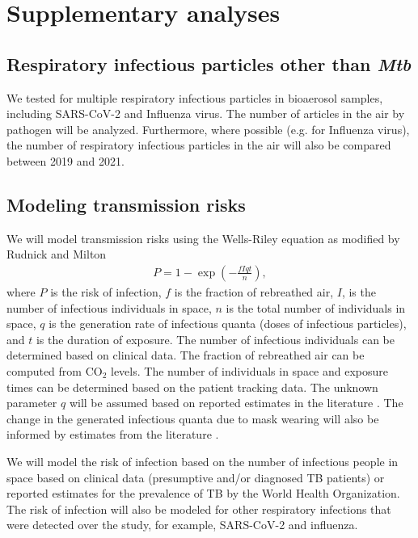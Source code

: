 \documentclass{article}
\begin{document}
\section{Supplementary analyses}

\subsection{Respiratory infectious particles other than \emph{Mtb}}

We tested for multiple respiratory infectious particles in bioaerosol samples, including SARS-CoV-2 and Influenza virus. The number of articles in the air by pathogen will be analyzed. Furthermore, where possible (e.g. for Influenza virus), the number of respiratory infectious particles in the air will also be compared between 2019 and 2021. 

\subsection{Modeling transmission risks}

We will model transmission risks using the Wells-Riley equation\cite{Riley1962ARRD} as modified by Rudnick and Milton\cite{Rudnick2003IndoorAir} 
\begin{align*}
    P = 1 - \exp\left(-\frac{fIqt}{n}\right),
\end{align*}
where $P$ is the risk of infection, $f$ is the fraction of rebreathed air, $I$, is the number of infectious individuals in space, $n$ is the total number of individuals in space, $q$ is the generation rate of infectious quanta (doses of infectious particles), and $t$ is the duration of exposure. The number of infectious individuals can be determined based on clinical data. The fraction of rebreathed air can be computed from CO$_2$ levels. The number of individuals in space and exposure times can be determined based on the patient tracking data. The unknown parameter $q$ will be assumed based on reported estimates in the literature \cite{Mikszewski2021GF,Banholzer2024PGPH,Andrews2014JID,Escombe2008PLoSMed,Nardell1991ARRD,Riley1962ARRD}. The change in the generated infectious quanta due to mask wearing will also be informed by estimates from the literature \cite{McCreesh2021BMJGlobalHealth,Dharmadhikari2012AJRCCM}. 

We will model the risk of infection based on the number of infectious people in space based on clinical data (presumptive and/or diagnosed TB patients) or reported estimates for the prevalence of TB by the World Health Organization\cite{WHO2022TBReport}. The risk of infection will also be modeled for other respiratory infections that were detected over the study, for example, SARS-CoV-2 and influenza.
\end{document}
